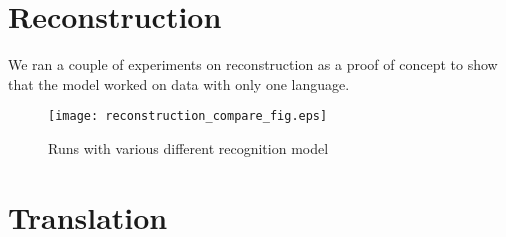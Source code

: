 \section{Reconstruction}

We ran a couple of experiments on reconstruction as a proof of concept to show
that the model worked on data with only one language.

\begin{figure}[h]
  \centering
  \texttt{[image: reconstruction\_compare\_fig.eps]}
  \caption{Runs with various different recognition model}
  \label{fig:mlp_reconstruction_plot}
\end{figure}



\section{Translation}
